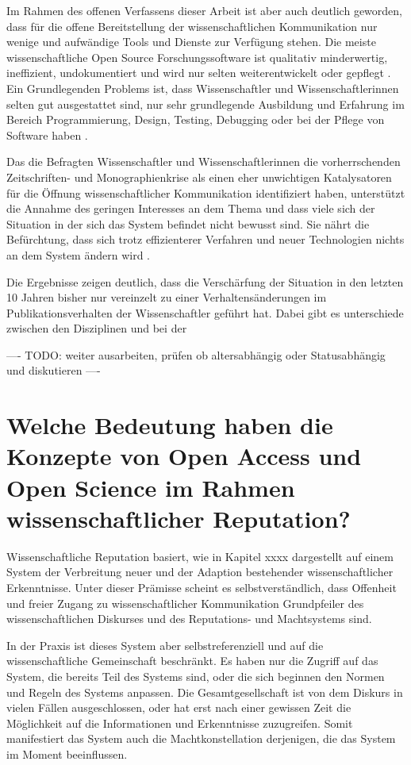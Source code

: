 Im Rahmen des offenen Verfassens dieser Arbeit ist aber auch deutlich geworden, dass für die offene Bereitstellung der wissenschaftlichen Kommunikation nur wenige und aufwändige Tools und Dienste zur Verfügung stehen. Die meiste wissenschaftliche Open Source Forschungssoftware ist qualitativ minderwertig, ineffizient, undokumentiert und wird nur selten weiterentwickelt oder gepflegt \cite{hey_2015_open}. Ein Grundlegenden Problems ist, dass Wissenschaftler und Wissenschaftlerinnen selten gut ausgestattet sind, nur sehr grundlegende Ausbildung und Erfahrung im Bereich Programmierung, Design, Testing, Debugging oder bei der Pflege von Software haben \cite{hey_2015_open}.

Das die Befragten Wissenschaftler und Wissenschaftlerinnen die vorherrschenden Zeitschriften- und Monographienkrise als einen eher unwichtigen Katalysatoren für die Öffnung wissenschaftlicher Kommunikation identifiziert haben, unterstützt die Annahme des geringen Interesses an dem Thema und dass viele sich der Situation in der sich das System befindet nicht bewusst sind. Sie nährt die Befürchtung, dass sich trotz effizienterer Verfahren und neuer Technologien nichts an dem System ändern wird \cite{Parks_2002_acadamic_faust}.

Die Ergebnisse zeigen deutlich, dass die Verschärfung der Situation in den letzten 10 Jahren bisher nur vereinzelt zu einer Verhaltensänderungen im Publikationsverhalten der Wissenschaftler geführt hat. Dabei gibt es unterschiede zwischen den Disziplinen und bei der

---- TODO: weiter ausarbeiten, prüfen ob altersabhängig oder Statusabhängig und diskutieren ----

\section{Welche Bedeutung haben die Konzepte von Open Access und Open Science im Rahmen wissenschaftlicher Reputation?}

Wissenschaftliche Reputation basiert, wie in Kapitel xxxx dargestellt auf einem System der Verbreitung neuer und der Adaption bestehender wissenschaftlicher Erkenntnisse. Unter dieser Prämisse scheint es selbstverständlich, dass Offenheit und freier Zugang zu wissenschaftlicher Kommunikation Grundpfeiler des wissenschaftlichen Diskurses und des Reputations- und Machtsystems sind.

In der Praxis ist dieses System aber selbstreferenziell und auf die wissenschaftliche Gemeinschaft beschränkt. Es haben nur die Zugriff auf das System, die bereits Teil des Systems sind, oder die sich beginnen den Normen und Regeln des Systems anpassen. Die Gesamtgesellschaft ist von dem Diskurs in vielen Fällen ausgeschlossen, oder hat erst nach einer gewissen Zeit die Möglichkeit auf die Informationen und Erkenntnisse zuzugreifen. Somit manifestiert das System auch die Machtkonstellation derjenigen, die das System im Moment beeinflussen.


